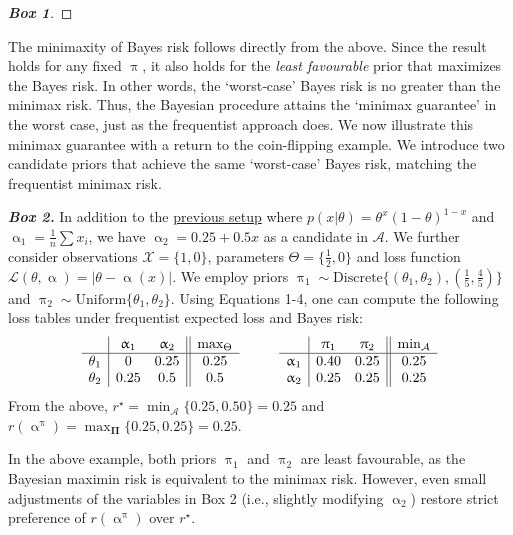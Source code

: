 \documentclass[letterpaper,12pt]{article}
\newcommand{\given}{|}
\begin{document}
\begin{framed}
\begin{proof}[\textbf{Box 1}]
\end{proof}\end{framed}  \newpage The minimaxity of Bayes risk follows directly from the above. Since the result holds for any fixed $\uppi$, it also holds for the \emph{least favourable} prior that maximizes the Bayes risk. In other words, the `worst‐case' Bayes risk is no greater than the minimax risk. Thus, the Bayesian procedure attains the `minimax guarantee' in the worst case, just as the frequentist approach does. We now illustrate this minimax guarantee with a return to the coin-flipping example. We introduce two candidate priors that achieve the same `worst-case' Bayes risk, matching the frequentist minimax risk.
\begin{framed}\hspace{-0.6cm}\textbf{\textit{Box 2.}}
 In addition to the \hyperref[ex:1]{previous setup} where $p(x \given \theta) = \theta^x(1-\theta)^{1-x}$ and $\upalpha_1 = \frac{1}{n}\sum x_i$, we have $\upalpha_2 = 0.25 + 0.5 x$ as a candidate in $\mathcal{A}$. We further consider observations $\mathcal{X} = \{1,0\}$, parameters $\Theta = \{\frac{1}{2}, 0\}$ and loss function $\mathcal{L}(\theta, \upalpha) = |\theta - \upalpha(x)|$. We employ priors $\uppi_1 \sim \text{Discrete}\{(\theta_1, \theta_2), (\frac{1}{5}, \frac{4}{5})\}$ and $\uppi_2 \sim \text{Uniform}\{\theta_1, \theta_2\}$. Using Equations 1-4, one can compute the following loss tables under frequentist expected loss and Bayes risk: \vspace{-0.25cm}
\[
{\begin{array}{c|cc||c}
		 & \upalpha_1 & \upalpha_2  & 	\text{max}_{\Theta} \\ \hline
		\theta_1 & 0 & 0.25   & 0.25 \\
		\theta_2 & 0.25 & 0.5 & 0.5
\end{array}}
\hspace{1cm}
{\begin{array}{c|cc||c}
		& \uppi_1 & \uppi_2  & \text{min}_{\mathcal{A}} \\ \hline
		\upalpha_1 & 0.40 & 0.25 & 0.25 \\
		\upalpha_2 & 0.25 & 0.25 & 0.25   
\end{array}} \vspace{-0.25cm}
\]
From the above, $r^{\star} = \min_{\mathcal{A}}\{0.25, 0.50\} =0.25$ and $r(\upalpha^{\uppi}) =  {\max_{\boldsymbol{\Pi}}\{0.25, 0.25\} =0.25}$. 
\end{framed}
In the above example, both priors $\uppi_1$ and $\uppi_2$ are least favourable, as the Bayesian maximin risk is equivalent to the minimax risk. However, even small adjustments of the variables in Box 2 (i.e., slightly modifying $\upalpha_2$) restore strict preference of $r(\upalpha^{\uppi})$ over $r^{\star}$.
\end{document}
